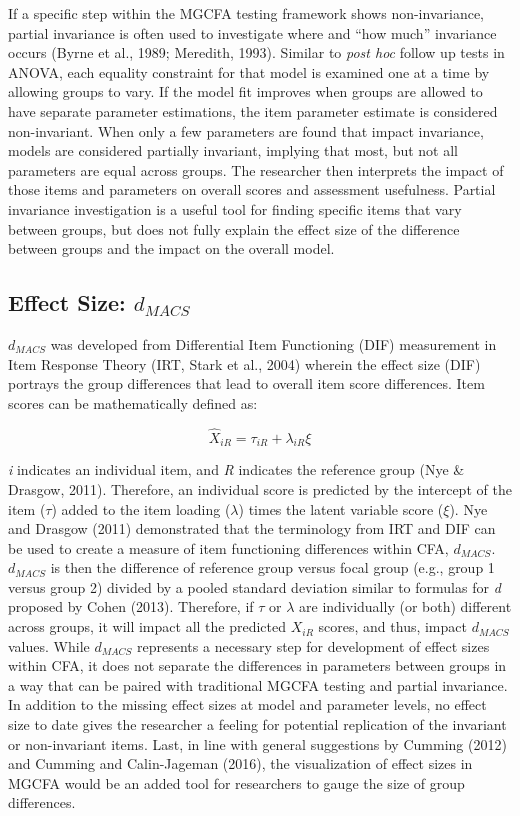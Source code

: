 \documentclass[
  man,floatsintext]{apa7}
\begin{document}
If a specific step within the MGCFA testing framework shows non-invariance, partial invariance is often used to investigate where and ``how much'' invariance occurs (Byrne et al., 1989; Meredith, 1993). Similar to \emph{post hoc} follow up tests in ANOVA, each equality constraint for that model is examined one at a time by allowing groups to vary. If the model fit improves when groups are allowed to have separate parameter estimations, the item parameter estimate is considered non-invariant. When only a few parameters are found that impact invariance, models are considered partially invariant, implying that most, but not all parameters are equal across groups. The researcher then interprets the impact of those items and parameters on overall scores and assessment usefulness. Partial invariance investigation is a useful tool for finding specific items that vary between groups, but does not fully explain the effect size of the difference between groups and the impact on the overall model.

\subsection{\texorpdfstring{Effect Size: \(d_{MACS}\)}{Effect Size: d\_\{MACS\}}}\label{effect-size-d_macs}

\(d_{MACS}\) was developed from Differential Item Functioning (DIF) measurement in Item Response Theory (IRT, Stark et al., 2004) wherein the effect size (DIF) portrays the group differences that lead to overall item score differences. Item scores can be mathematically defined as:

\[
\hat{X}_{iR} = \tau_{iR} + \lambda_{iR}\xi
\]

\emph{i} indicates an individual item, and \emph{R} indicates the reference group (Nye \& Drasgow, 2011). Therefore, an individual score is predicted by the intercept of the item (\(\tau\)) added to the item loading (\(\lambda\)) times the latent variable score (\(\xi\)). Nye and Drasgow (2011) demonstrated that the terminology from IRT and DIF can be used to create a measure of item functioning differences within CFA, \(d_{MACS}\). \(d_{MACS}\) is then the difference of reference group versus focal group (e.g., group 1 versus group 2) divided by a pooled standard deviation similar to formulas for \emph{d} proposed by Cohen (2013). Therefore, if \(\tau\) or \(\lambda\) are individually (or both) different across groups, it will impact all the predicted \(X_{iR}\) scores, and thus, impact \(d_{MACS}\) values. While \(d_{MACS}\) represents a necessary step for development of effect sizes within CFA, it does not separate the differences in parameters between groups in a way that can be paired with traditional MGCFA testing and partial invariance. In addition to the missing effect sizes at model and parameter levels, no effect size to date gives the researcher a feeling for potential replication of the invariant or non-invariant items. Last, in line with general suggestions by Cumming (2012) and Cumming and Calin-Jageman (2016), the visualization of effect sizes in MGCFA would be an added tool for researchers to gauge the size of group differences.
\end{document}

